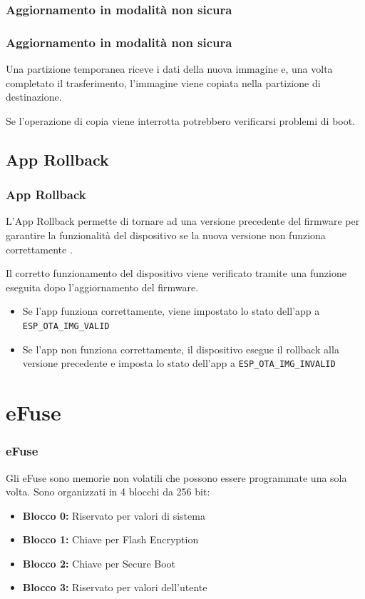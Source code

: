 \documentclass{beamer}
\begin{document}
\subsubsection{Aggiornamento in modalità non sicura}
\begin{frame}
\frametitle{Aggiornamento in modalità non sicura}
Una partizione temporanea riceve
i dati della nuova immagine e, una volta completato il trasferimento, l'immagine viene
copiata nella partizione di destinazione.

\vspace{1em}
\noindent

Se l'operazione di copia viene interrotta potrebbero verificarsi problemi di boot.
\end{frame}

\subsection{App Rollback}
\begin{frame}
\frametitle{App Rollback}
L'App Rollback permette di tornare ad una versione precedente del firmware per
garantire la funzionalità del dispositivo se la nuova
versione non funziona correttamente .

Il corretto funzionamento del dispositivo viene verificato tramite una funzione
eseguita dopo l'aggiornamento del firmware. 

\begin{itemize}
  \item Se l'app funziona correttamente, viene impostato lo stato dell'app a
    \texttt{ESP\_OTA\_IMG\_VALID}

  \item Se l'app non funziona correttamente, il dispositivo esegue il rollback alla versione
    precedente e imposta lo stato dell'app a \texttt{ESP\_OTA\_IMG\_INVALID}

\end{itemize}
\end{frame}


\section{eFuse}
\begin{frame}
  \frametitle{eFuse}
  Gli eFuse sono memorie non volatili che possono essere programmate una sola volta.
  Sono organizzati in 4 blocchi da 256 bit:
  \begin{itemize}
    \item \textbf{Blocco 0:} Riservato per valori di sistema
    \item \textbf{Blocco 1:} Chiave per Flash Encryption
    \item \textbf{Blocco 2:} Chiave per Secure Boot
    \item \textbf{Blocco 3:} Riservato per valori dell'utente
  \end{itemize}
\end{frame}
\end{document}
